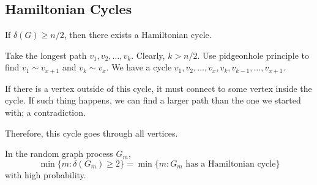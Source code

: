 \subsection{Hamiltonian Cycles}
\begin{thm}[Dirac]
	If $\delta(G) \ge n/2$, then there exists a Hamiltonian cycle.
\end{thm}
\begin{sk}
	Take the longest path $v_1, v_2, \dots, v_k$. Clearly, $k > n/2$. Use pidgeonhole principle to find $v_1 \sim v_{x+1}$ and  $v_k \sim v_{x}$. We have a cycle $v_1, v_2, \dots, v_x, v_k, v_{k-1}, \dots, v_{x+1}$.

	If there is a vertex outside of this cycle, it must connect to some vertex inside the cycle. If such thing happens, we can find a larger path than the one we started with; a contradiction.

	Therefore, this cycle goes through all vertices.
\end{sk}

\begin{thm}
	In the random graph process $G_m$,  \[
		\min\{m : \delta(G_m) \ge 2\} = \min\{m : G_m \text{\ has a Hamiltonian cycle}\}
	\]
	with high probability.
\end{thm}

